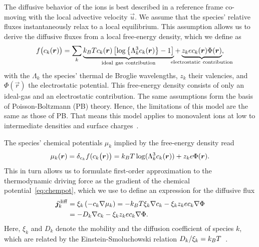 The diffusive behavior of the ions is best described in a reference frame co-moving with the local advective velocity $\vec{u}$. We assume that the species' relative fluxes instantaneously relax to a local equilibrium. This assumption allows us to derive the diffusive fluxes from a local free-energy density, which we define as
%
\begin{equation}
\label{eq:model_free_energy}
f \big( c_{k}(\vec{r}) \big) = \sum_{k} \underbrace{\kT c_{k}(\vec{r}) \left[ \log \left\lbrace \Lambda_{k}^{3} c_{k}(\vec{r}) \right\rbrace - 1 \right] }_{\mathrm{ideal~gas~contribution}} + \underbrace{z_{k} e c_{k}(\vec{r}) \Phi(\vec{r})}_{\mathclap{\mathrm{electrostatic~contribution}}} ,
\end{equation}
%
with the $\Lambda_{k}$ the species' thermal de Broglie wavelengths, $z_{k}$ their valencies, and $\Phi(\vec{r})$ the electrostatic potential. This free-energy density consists of only an ideal-gas and an electrostatic contribution. The same assumptions form the basis of Poisson-Boltzmann (PB) theory. Hence, the limitations of this model are the same as those of PB. That means this model applies to monovalent ions at low to intermediate densities and surface charges~\cite{deserno00a,deserno00b,holm01a,degraaf12a}.

The species' chemical potentials $\mu_{k}$ implied by the free-energy density read
%
\begin{equation}
\label{eq:chempot}
\mu_{k}(\bm{r}) = \delta_{c_k} f(c_{k}\big( \bm r ) \big) = k_{B}T \log(\Lambda_{k}^{3} c_{k}(\bm{r})) + z_{k} e \Phi(\bm{r}) .
\end{equation}
%
This in turn allows us to formulate first-order approximation to the thermodynamic driving force as the gradient of the chemical potential~\eqref{eq:chempot}, which we use to define an expression for the diffusive flux
%
\begin{equation}
\begin{aligned}
\label{eq:model_jdiff}
\bm{j}_{k}^{\mathrm{diff}} &= \xi_{k} \left( -c_{k} \nabla \mu_{k} \right) = -k_{B}T \xi_{k} \nabla c_{k} - \xi_{k} z_{k} e c_{k} \nabla\Phi \\
& = -D_{k} \nabla c_{k} - \xi_{k} z_{k} e c_{k} \nabla \Phi . 
\end{aligned}
\end{equation}
%
Here, $\xi_{k}$ and $D_{k}$ denote the mobility and the diffusion coefficient of species $k$, which are related by the Einstein-Smoluchowski relation $D_{k} / \xi_{k} = k_{B}T$~\cite{einstein1905a,smoluchowski1906a}.

